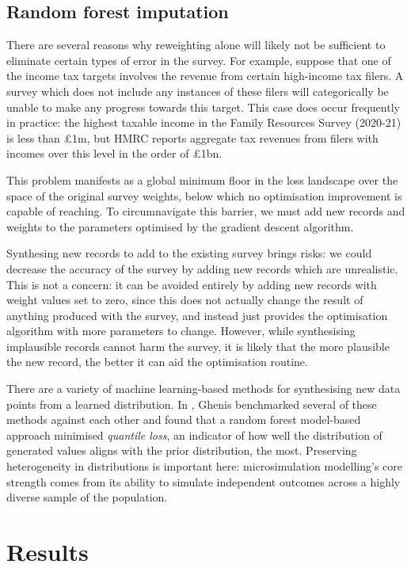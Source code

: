 \documentclass[10pt,journal,compsoc]{IEEEtran}
\begin{document}
\subsection{Random forest imputation}

There are several reasons why reweighting alone will likely not be sufficient to eliminate certain types of error in the survey. For example, suppose that one of the income tax targets involves the revenue from certain high-income tax filers. A survey which does not include any instances of these filers will categorically be unable to make any progress towards this target. This case does occur frequently in practice: the highest taxable income in the Family Resources Survey (2020-21) is less than £1m, but HMRC reports aggregate tax revenues from filers with incomes over this level in the order of £1bn.

This problem manifests as a global minimum floor in the loss landscape over the space of the original survey weights, below which no optimisation improvement is capable of reaching. To circumnavigate this barrier, we must add new records and weights to the parameters optimised by the gradient descent algorithm.

Synthesing new records to add to the existing survey brings risks: we could decrease the accuracy of the survey by adding new records which are unrealistic. This is not a concern: it can be avoided entirely by adding new records with weight values set to zero, since this does not actually change the result of anything produced with the survey, and instead just provides the optimisation algorithm with more parameters to change. However, while synthesising implausible records cannot harm the survey, it is likely that the more plausible the new record, the better it can aid the optimisation routine.

There are a variety of machine learning-based methods for synthesising new data points from a learned distribution. In \cite{ghenis_quantile_regression}, Ghenis benchmarked several of these methods against each other and found that a random forest model-based approach minimised \emph{quantile loss}, an indicator of how well the distribution of generated values aligns with the prior distribution, the most. Preserving heterogeneity in distributions is important here: microsimulation modelling's core strength comes from its ability to simulate independent outcomes across a highly diverse sample of the population.



\section{Results}
\end{document}
